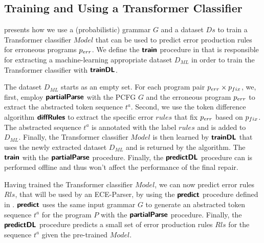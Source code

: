 \subsection{Training and Using a Transformer Classifier}
\label{sec:whole-system:training-classifier}

\begin{figure}[t]
  \centering
  \begin{minipage}[t]{0.49\linewidth}
    \centering
    
  \end{minipage}
  \hspace{0.02\linewidth}
  \begin{minipage}[t]{0.47\linewidth}
    \centering
    
  \end{minipage}
\end{figure}

%
 presents how we use a (probabilistic)
grammar $G$ and a dataset $Ds$ to train a Transformer classifier $Model$ that
can be used to predict error production rules for erroneous programs $p_{err}$. We
define the $\bm{\mathsf{train}}$ procedure in  that is
responsible for extracting a machine-learning appropriate dataset $D_{ML}$ in
order to train the Transformer classifier with $\bm{\mathsf{trainDL}}$.

The dataset $D_{ML}$ starts as an empty set. For each program pair $p_{err} \times
p_{fix}$, we, first, employ $\bm{\mathsf{partialParse}}$ with the PCFG $G$ and the erroneous
program $p_{err}$ to extract the abstracted token sequence $t^a$. Second, we use
the token difference algorithm $\bm{\mathsf{diffRules}}$ to extract the specific error $rules$
that fix $p_{err}$ based on $p_{fix}$. The abstracted sequence $t^a$ is annotated
with the label $rules$ and is added to $D_{ML}$. Finally, the Transformer
classifier $Model$ is then learned by $\bm{\mathsf{trainDL}}$ that uses the newly
extracted dataset $D_{ML}$ and is returned by the algorithm. The $\bm{\mathsf{train}}$
with the $\bm{\mathsf{partialParse}}$ procedure. Finally, the $\bm{\mathsf{predictDL}}$ procedure can is
performed offline and thus won't affect the performance of the final repair.

%
Having trained the Transformer classifier $Model$, we can now predict error
rules $Rls$, that will be used by an ECE-Parser, by using the $\bm{\mathsf{predict}}$
procedure defined in . $\bm{\mathsf{predict}}$ uses the same input
grammar $G$ to generate an abstracted token sequence $t^a$ for the program $P$
with the $\bm{\mathsf{partialParse}}$ procedure. Finally, the $\bm{\mathsf{predictDL}}$ procedure
predicts a small set of error production rules $Rls$ for the sequence $t^a$
given the pre-trained $Model$.

